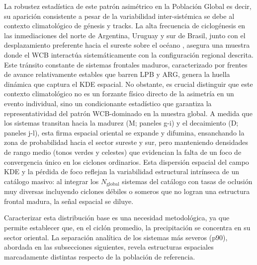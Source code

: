 La robustez estadística de este patrón asimétrico en la Población Global es decir, su aparición consistente a pesar de la variabilidad inter-sistémica se debe al contexto climatológico de génesis y tracks. La alta frecuencia de ciclogénesis en las inmediaciones del norte de Argentina, Uruguay y sur de Brasil, junto con el desplazamiento preferente hacia el sureste sobre el océano \citep{mendes2010climatology, simmonds2000mean}, asegura una muestra donde el WCB interactúa sistemáticamente con la configuración regional descrita. Este tránsito constante de sistemas frontales maduros, caracterizado por frentes de avance relativamente estables que barren LPB y ARG, genera la huella dinámica que captura el KDE espacial. No obstante, es crucial distinguir que este contexto climatológico no es un forzante físico directo de la asimetría en un evento individual, sino un condicionante estadístico que garantiza la representatividad del patrón WCB-dominado en la muestra global.
A medida que los sistemas transitan hacia la madurez (M; paneles g-i) y el decaimiento (D; paneles j-l), esta firma espacial oriental se expande y difumina, ensanchando la zona de probabilidad hacia el sector sureste y sur, pero manteniendo densidades de rango medio (tonos verdes y celestes) que evidencian la falta de un foco de convergencia único en los ciclones ordinarios. Esta dispersión espacial del campo KDE y la pérdida de foco reflejan la variabilidad estructural intrínseca de un catálogo masivo: al integrar los $N_{\text{global}}$ sistemas del catálogo con tasas de oclusión muy diversas incluyendo ciclones débiles o someros que no logran una estructura frontal madura, la señal espacial se diluye. 

Caracterizar esta distribución base es una necesidad metodológica, ya que permite establecer que, en el ciclón promedio, la precipitación se concentra en su sector oriental. La separación analítica de los sistemas más severos (p90), abordada en las subsecciones siguientes, revela estructuras espaciales marcadamente distintas respecto de la población de referencia.
